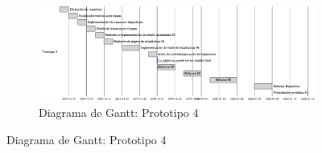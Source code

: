 \begin{figure}
\begin{figure}[H]
    \centering
    \includegraphics[width=19cm]{./img/grantt/p4.png}
    \caption{Diagrama de Gantt: Prototipo 4}
    \label{fig:grant.p3s}
\end{figure}
\end{figure}